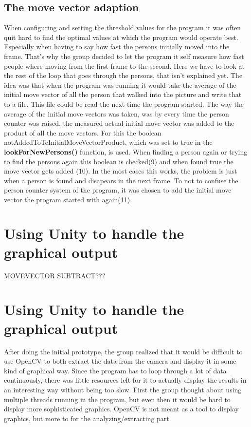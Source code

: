 \subsection{The move vector adaption}
When configuring and setting the threshold values for the program it was often quit hard to find the optimal values at which the program would operate best. Especially when having to say how fast the persons initially moved into the frame. That's why the group decided to let the program it self measure how fast people where moving from the first frame to the second. Here we have to look at the rest of the loop that goes through the persons, that isn't explained yet. The idea was that when the program was running it would take the average of the initial move vector of all the person that walked into the picture and write that to a file. This file could be read the next time the program started.
The way the average of the initial move vectors was taken, was by every time the person counter was raised, the measured actual initial move vector was added to the product of all the move vectors. For this the boolean notAddedToTeInitialMoveVectorProduct, which was set to true in the \textbf{lookForNewPersons()} function, is used. When finding a person again or trying to find the persons again this boolean is checked(9) and when found true the move vector gets added (10). In the most cases this works, the problem is just when a person is found and disapears in the next frame. To not to confuse the person counter system of the program, it was chosen to add the initial move vector the program started with again(11). 

\section{Using Unity to handle the graphical output}

MOVEVECTOR SUBTRACT???

\section{Using Unity to handle the graphical output}\label{unityStart}
After doing the initial prototype, the group realized that it would be difficult to use OpenCV to both extract the data from the camera and display it in some kind of graphical way. Since the program has to loop through a lot of data continuously, there was little resources left for it to actually display the results in an interesting way without being too slow. First the group thought about using multiple threads running in the program, but even then it would be hard to display more sophisticated graphics. OpenCV is not meant as a tool to display graphics, but more to for the analyzing/extracting part.

